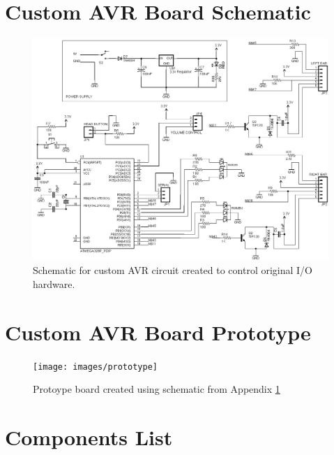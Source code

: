 \documentclass[12pt, a4paper]{article}
\begin{document}
\begin{appendices}
\section{Custom AVR Board Schematic}\label{app:avrschematic}
	\begin{figure}[H] 
		\centerline{\includegraphics[scale=0.98, angle=90]{images/avrdesign}}
		\caption[Schematic for custom AVR board]{Schematic for custom AVR circuit created to control original \ac{I/O} hardware.}
		\label{fig:avrschematicimage}
	\end{figure}

\newpage
	
\section{Custom AVR Board Prototype}\label{app:prototype}
	\begin{figure}[H] 
		\centerline{\texttt{[image: images/prototype]}}
		\caption[Prototype of custom AVR board]{Protoype board created using schematic from Appendix \ref{app:avrschematic}}
		\label{fig:prototypeimage}
	\end{figure}

\newpage
		
\section{Components List}\label{app:componentslist}
	

\end{appendices}
\end{document}
